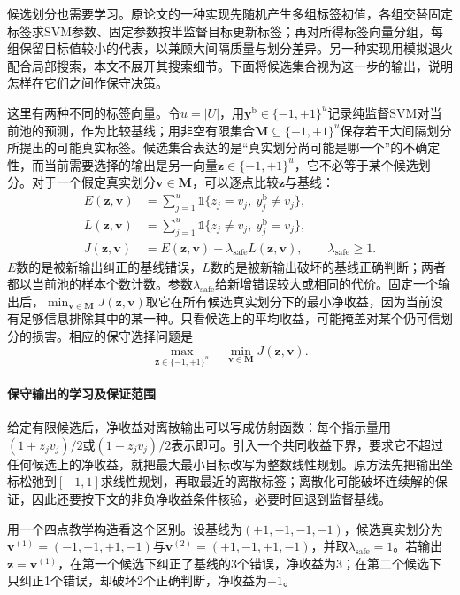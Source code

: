 候选划分也需要学习。原论文的一种实现先随机产生多组标签初值，各组交替固定标签求SVM参数、固定参数按半监督目标更新标签；再对所得标签向量分组，每组保留目标值较小的代表，以兼顾大间隔质量与划分差异。另一种实现用模拟退火配合局部搜索，本文不展开其搜索细节。下面将候选集合视为这一步的输出，说明怎样在它们之间作保守决策。

这里有两种不同的标签向量。令$u=|U|$，用$\bm y^{\mathrm b}\in\{-1,+1\}^u$记录纯监督SVM对当前池的预测，作为比较基线；用非空有限集合$\bm M\subseteq\{-1,+1\}^u$保存若干大间隔划分所提出的可能真实标签。候选集合表达的是“真实划分尚可能是哪一个”的不确定性，而当前需要选择的输出是另一向量$\bm z\in\{-1,+1\}^u$，它不必等于某个候选划分。对于一个假定真实划分$\bm v\in\bm M$，可以逐点比较$\bm z$与基线：
\[
  \begin{aligned}
    E(\bm z,\bm v)
      &=\sum_{j=1}^{u}\mathbb1\{z_j=v_j,\ y_j^{\mathrm b}\ne v_j\},\\
    L(\bm z,\bm v)
      &=\sum_{j=1}^{u}\mathbb1\{z_j\ne v_j,\ y_j^{\mathrm b}=v_j\},\\
    J(\bm z,\bm v)
      &=E(\bm z,\bm v)-\lambda_{\mathrm{safe}}L(\bm z,\bm v),
       \qquad\lambda_{\mathrm{safe}}\geq1.
  \end{aligned}
\]
$E$数的是被新输出纠正的基线错误，$L$数的是被新输出破坏的基线正确判断；两者都以当前池的样本个数计数。参数$\lambda_{\mathrm{safe}}$给新增错误较大或相同的代价。固定一个输出后，$\min_{\bm v\in\bm M}J(\bm z,\bm v)$取它在所有候选真实划分下的最小净收益，因为当前没有足够信息排除其中的某一种。只看候选上的平均收益，可能掩盖对某个仍可信划分的损害。相应的保守选择问题是
\begin{equation}
  \label{eq:classification-s4vm-safe-selection}
  \max_{\bm z\in\{-1,+1\}^{u}}\quad
      \min_{\bm v\in\bm M}J(\bm z,\bm v).
\end{equation}

\paragraph{保守输出的学习及保证范围}
给定有限候选后，净收益对离散输出可以写成仿射函数：每个指示量用$(1+z_jv_j)/2$或$(1-z_jv_j)/2$表示即可。引入一个共同收益下界，要求它不超过任何候选上的净收益，就把最大最小目标改写为整数线性规划。原方法先把输出坐标松弛到$[-1,1]$求线性规划，再取最近的离散标签；离散化可能破坏连续解的保证，因此还要按下文的非负净收益条件核验，必要时回退到监督基线。

用一个四点教学构造看这个区别。设基线为$(+1,-1,-1,-1)$，候选真实划分为$\bm v^{(1)}=(-1,+1,+1,-1)$与$\bm v^{(2)}=(+1,-1,+1,-1)$，并取$\lambda_{\mathrm{safe}}=1$。若输出$\bm z=\bm v^{(1)}$，在第一个候选下纠正了基线的3个错误，净收益为3；在第二个候选下只纠正1个错误，却破坏2个正确判断，净收益为$-1$。

